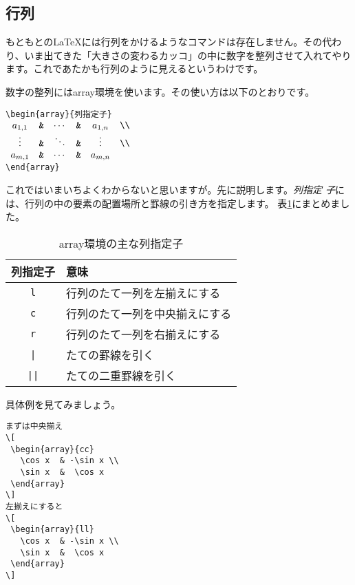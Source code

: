\subsection{行列}
もともとの{\LaTeX}には行列をかけるようなコマンドは存在しません。その代わ
り、いま出てきた「大きさの変わるカッコ」の中に数字を整列させて入れてやり
ます。これであたかも行列のように見えるというわけです。

数字の整列にはarray環境を使います。その使い方は以下のとおりです。
\begin{screen}
\verb+\begin{array}{列指定子}+ \\
$\begin{array}{cccccc}
 a_{1,1} & \verb+&+ & \cdots & \verb+&+ & a_{1,n} & \verb+\\+ \\
 \vdots  & \verb+&+ & \ddots & \verb+&+ & \vdots  & \verb+\\+ \\
 a_{m,1} & \verb+&+ & \cdots & \verb+&+ & a_{m,n} &
\end{array}$\\
\verb+\end{array}+
\end{screen}
これではいまいちよくわからないと思いますが。先に説明します。\emph{列指定
子}には、行列の中の要素の配置場所と罫線の引き方を指定します。
表\ref{tab:clm}にまとめました。
\begin{table}[htbp]
\begin{center}
\caption{array環境の主な列指定子}
\label{tab:clm}
\begin{tabular}{cl}
\hline
列指定子 & 意味 \\
\hline
\verb+l+  & 行列のたて一列を左揃えにする \\
\verb+c+  & 行列のたて一列を中央揃えにする \\
\verb+r+  & 行列のたて一列を右揃えにする \\
\verb+|+  & たての罫線を引く \\
\verb+||+ & たての二重罫線を引く\\
\hline
\end{tabular}
\end{center}
\end{table}
具体例を見てみましょう。\\
\begin{minipage}[c]{.50\textwidth}
\begin{screen}
\small
\begin{verbatim}
まずは中央揃え
\[
 \begin{array}{cc}
   \cos x  & -\sin x \\
   \sin x  &  \cos x
 \end{array}
\]
左揃えにすると
\[
 \begin{array}{ll}
   \cos x  & -\sin x \\
   \sin x  &  \cos x
 \end{array}
\]
\end{verbatim}
\end{screen}
\end{minipage}%
